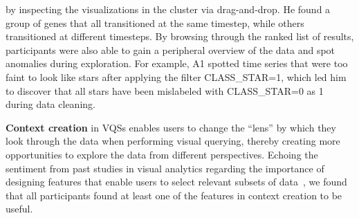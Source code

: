  by inspecting the visualizations
 in the cluster via drag-and-drop.
 He found a group of genes that all transitioned
 at the same timestep, while others transitioned
 at different timesteps. By browsing through the ranked list of
 results, participants were also able to gain a peripheral overview of the data and spot anomalies during exploration. For example, A1 spotted time series that were too faint to look like stars after applying the filter CLASS\_STAR=1,
 which led him to discover that all stars have been mislabeled with CLASS\_STAR=0 as 1 during data cleaning.
 \par \textbf{Context creation} in VQSs enables users to change the ``lens''
 by which they look through the data
 when performing visual querying,
 thereby creating more opportunities
 to explore the data from different perspectives. Echoing the sentiment from past studies in visual analytics regarding the importance of designing features that enable users to select relevant subsets of data~\cite{Shneiderman1994,Amar2005,Heer2012,Lee2019}, we found that all participants found at least one of the features in context creation to be useful.
